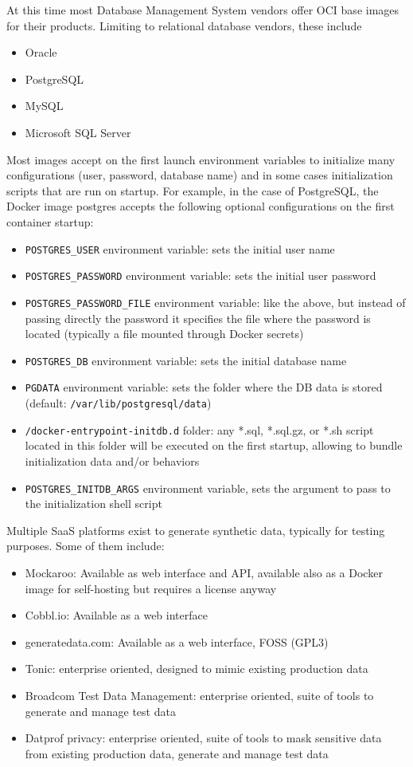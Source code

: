 \documentclass[12pt, letterpaper, twoside]{article}
\begin{document}
At this time most Database Management System vendors offer OCI base images for their products. Limiting to relational database vendors, these include
\begin{itemize}
    \item Oracle
    \item PostgreSQL
    \item MySQL
    \item Microsoft SQL Server
\end{itemize}
Most images accept on the first launch environment variables to initialize many configurations (user, password, database name) and in some cases initialization scripts that are run on startup.
For example, in the case of PostgreSQL, the Docker image postgres accepts the following optional configurations on the first container startup:
\begin{itemize}
    \item \verb|POSTGRES_USER| environment variable: sets the initial user name
    \item \verb|POSTGRES_PASSWORD| environment variable: sets the initial user password
    \item \verb|POSTGRES_PASSWORD_FILE| environment variable: like the above, but instead of passing directly the password it specifies the file where the password is located (typically a file mounted through Docker secrets)
    \item \verb|POSTGRES_DB| environment variable: sets the initial database name
    \item \verb|PGDATA| environment variable: sets the folder where the DB data is stored (default: \verb|/var/lib/postgresql/data|)
    \item \verb|/docker-entrypoint-initdb.d| folder: any *.sql, *.sql.gz, or *.sh script located in this folder will be executed on the first startup, allowing to bundle initialization data and/or behaviors
    \item \verb|POSTGRES_INITDB_ARGS| environment variable, sets the argument to pass to the initialization shell script
\end{itemize}

Multiple SaaS platforms exist to generate synthetic data, typically for testing purposes. Some of them include:
\begin{itemize}
    \item Mockaroo: Available as web interface and API, available also as a Docker image for self-hosting but requires a license anyway
    \item Cobbl.io: Available as a web interface
    \item generatedata.com: Available as a web interface, FOSS (GPL3)
    \item Tonic: enterprise oriented, designed to mimic existing production data
    \item Broadcom Test Data Management: enterprise oriented, suite of tools to generate and manage test data
    \item Datprof privacy: enterprise oriented, suite of tools to mask sensitive data from existing production data, generate and manage test data
\end{itemize}
\end{document}
